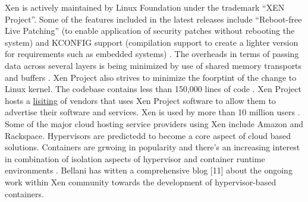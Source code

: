 \documentclass[9pt,twocolumn,twoside]{styles/osajnl}
\begin{document}
Xen is actively maintained by Linux Foundation under the trademark “XEN Project”. Some of the features included in the latest releases include “Reboot-free Live Patching” (to enable application of security patches without rebooting the system) and KCONFIG support (compilation support to create a lighter version for requirements such as embedded systems) \cite{www-xen-4.7-feature-list}. The overheads in terms of passing data across several layers is being minimized by use of shared memory transports and buffers \cite{www-tech-comparison}. Xen Project also strives to minimize the foorptint of the change to Linux kernel. The codebase contains less than 150,000 lines of code \cite{www-xen-wiki}. Xen Project hosts a \href{https://xenproject.org/directory/directory.html} {lisiting} of vendors that uses Xen Project software to allow them to advertise their software and services. Xen is used by more than 10 million users \cite{www-hypervisor-17} . Some of the major cloud hosting service providers using Xen include Amazon and Rackspace. Hypervisors are predictedd to become a core aspect of cloud based solutions. Containers are grwoing in popularity and there's an increasing interest in combination of isolation aspects of hypervisor and container runtime environments \cite{www-hypervisor-containers}.  Bellani has witten a comprehensive blog [11] about the ongoing work within Xen community towards the development of hypervisor-based containers.




 
\end{document}
